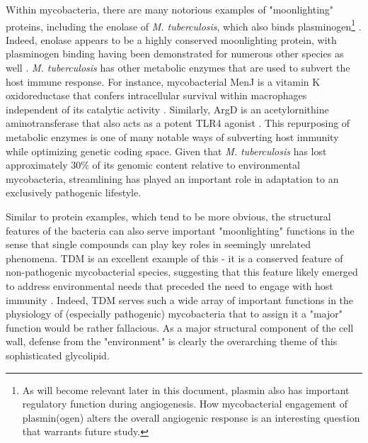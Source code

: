 Within mycobacteria, there are many notorious examples of "moonlighting" proteins, including the enolase of \textit{M. tuberculosis}, which also binds plasminogen\footnote{As will become relevant later in this document, plasmin also has important regulatory function during angiogenesis. How mycobacterial engagement of plasmin(ogen) alters the overall angiogenic response is an interesting question that warrants future study.} \citep{Rahi2017}. Indeed, enolase appears to be a highly conserved moonlighting protein, with plasminogen binding having been demonstrated for numerous other species as well \citep{Figueirido2015, Seweryn2007, Candela2009, Floden2011, Venegas2007, Agarwal2008}. \textit{M. tuberculosis} has other metabolic enzymes that are used to subvert the host immune response. For instance, mycobacterial MenJ is a vitamin K oxidoreductase that confers intracellular survival within macrophages independent of its catalytic activity \citep{Kumar2020}. Similarly, ArgD is an acetylornithine aminotransferase that also acts as a potent TLR4 agonist \citep{Nehri2022}. This repurposing of metabolic enzymes is one of many notable ways of subverting host immunity while optimizing genetic coding space. Given that \textit{M. tuberculosis} has lost approximately 30\% of its genomic content relative to environmental mycobacteria, streamlining has played an important role in adaptation to an exclusively pathogenic lifestyle. 

Similar to protein examples, which tend to be more obvious, the structural features of the bacteria can also serve important "moonlighting" functions in the sense that single compounds can play key roles in seemingly unrelated phenomena. TDM is an excellent example of this - it is a conserved feature of non-pathogenic mycobacterial species, suggesting that this feature likely emerged to address environmental needs that preceded the need to engage with host immunity \citep{Kremer2002, Pacheco2013}. Indeed, TDM serves such a wide array of important functions in the physiology of (especially pathogenic) mycobacteria that to assign it a "major" function would be rather fallacious. As a major structural component of the cell wall, defense from the "environment" is clearly the overarching theme of this sophisticated glycolipid. 


